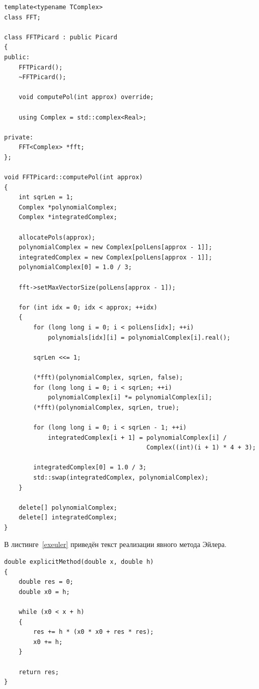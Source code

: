 \begin{lstlisting}[caption={Метод Пикара, основанный на быстром преобразовании Фурье},label=fftpicard]
template<typename TComplex>
class FFT;

class FFTPicard : public Picard
{
public:
    FFTPicard();
    ~FFTPicard();

    void computePol(int approx) override;

    using Complex = std::complex<Real>;

private:
    FFT<Complex> *fft;
};

void FFTPicard::computePol(int approx)
{
    int sqrLen = 1;
    Complex *polynomialComplex;
    Complex *integratedComplex;

    allocatePols(approx);
    polynomialComplex = new Complex[polLens[approx - 1]];
    integratedComplex = new Complex[polLens[approx - 1]];
    polynomialComplex[0] = 1.0 / 3;

    fft->setMaxVectorSize(polLens[approx - 1]);

    for (int idx = 0; idx < approx; ++idx)
    {
        for (long long i = 0; i < polLens[idx]; ++i)
            polynomials[idx][i] = polynomialComplex[i].real();

        sqrLen <<= 1;

        (*fft)(polynomialComplex, sqrLen, false);
        for (long long i = 0; i < sqrLen; ++i)
            polynomialComplex[i] *= polynomialComplex[i];
        (*fft)(polynomialComplex, sqrLen, true);

        for (long long i = 0; i < sqrLen - 1; ++i)
            integratedComplex[i + 1] = polynomialComplex[i] /
                                       Complex((int)(i + 1) * 4 + 3);

        integratedComplex[0] = 1.0 / 3;
        std::swap(integratedComplex, polynomialComplex);
    }

    delete[] polynomialComplex;
    delete[] integratedComplex;
}
\end{lstlisting}

В листинге~\ref{exeuler} приведён текст реализации явного метода Эйлера.
\begin{lstlisting}[caption={Явный метод Эйлера},label=exeuler]
double explicitMethod(double x, double h)
{
    double res = 0;
    double x0 = h;

    while (x0 < x + h)
    {
        res += h * (x0 * x0 + res * res);
        x0 += h;
    }

    return res;
}
\end{lstlisting}

